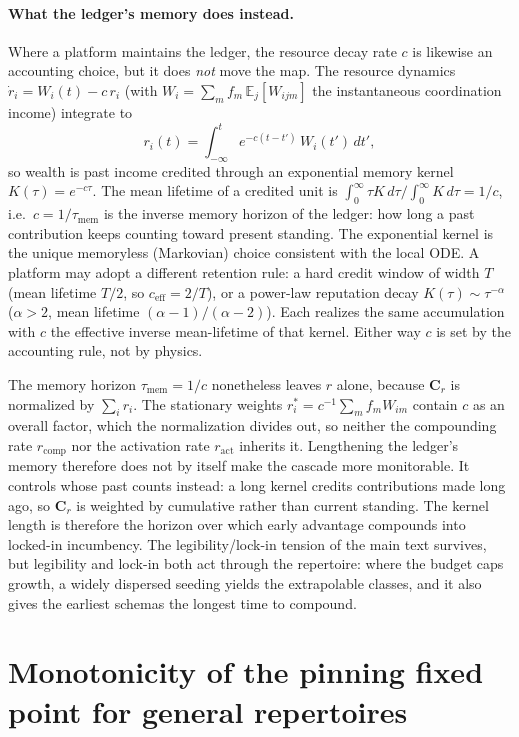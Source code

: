 \documentclass[
  aps,prx,
  preprint,
  superscriptaddress,
  nofootinbib
]{revtex4-2}
\newcommand{\Cr}{\mathbf{C}_r}
\newcommand{\ract}{r_{\mathrm{act}}}
\newcommand{\rcomp}{r_{\mathrm{comp}}}
\begin{document}
\paragraph{What the ledger's memory does instead.} Where a platform maintains the ledger, the resource decay rate $c$ is likewise an accounting choice, but it does \emph{not} move the map. The resource dynamics $\dot r_i=W_i(t)-c\,r_i$ (with $W_i=\sum_m f_m\,\mathbb{E}_j[W_{ijm}]$ the instantaneous coordination income) integrate to
\begin{equation}\label{SM-eq:sm-ledger-kernel}
r_i(t)=\int_{-\infty}^{t} e^{-c(t-t')}\,W_i(t')\,dt' ,
\end{equation}
so wealth is past income credited through an exponential memory kernel $K(\tau)=e^{-c\tau}$. The mean lifetime of a credited unit is $\int_0^\infty \tau K\,d\tau/\int_0^\infty K\,d\tau=1/c$, i.e.\ $c=1/\tau_{\mathrm{mem}}$ is the inverse memory horizon of the ledger: how long a past contribution keeps counting toward present standing. The exponential kernel is the unique memoryless (Markovian) choice consistent with the local ODE. A platform may adopt a different retention rule: a hard credit window of width $T$ (mean lifetime $T/2$, so $c_{\mathrm{eff}}=2/T$), or a power-law reputation decay $K(\tau)\sim\tau^{-\alpha}$ ($\alpha>2$, mean lifetime $(\alpha-1)/(\alpha-2)$). Each realizes the same accumulation with $c$ the effective inverse mean-lifetime of that kernel. Either way $c$ is set by the accounting rule, not by physics.

The memory horizon $\tau_{\mathrm{mem}}=1/c$ nonetheless leaves $r$ alone, because $\Cr$ is normalized by $\sum_i r_i$. The stationary weights $r_i^*=c^{-1}\sum_m f_m W_{im}$ contain $c$ as an overall factor, which the normalization divides out, so neither the compounding rate $\rcomp$ nor the activation rate $\ract$ inherits it. Lengthening the ledger's memory therefore does not by itself make the cascade more monitorable. It controls whose past counts instead: a long kernel credits contributions made long ago, so $\Cr$ is weighted by cumulative rather than current standing. The kernel length is therefore the horizon over which early advantage compounds into locked-in incumbency. The legibility/lock-in tension of the main text survives, but legibility and lock-in both act through the repertoire: where the budget caps growth, a widely dispersed seeding yields the extrapolable classes, and it also gives the earliest schemas the longest time to compound.

\section{Monotonicity of the pinning fixed point for general repertoires}\label{sm:monotone}
\end{document}
